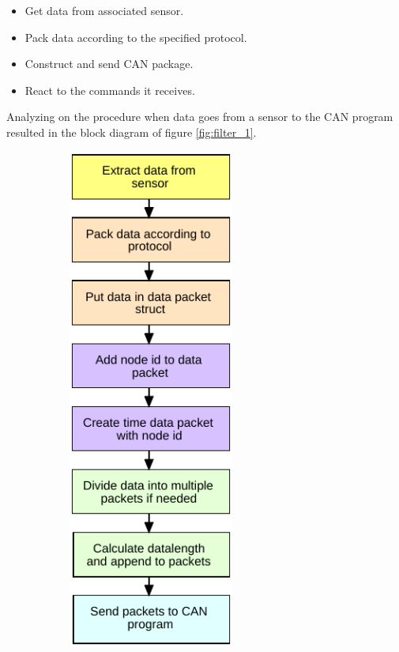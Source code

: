 \begin{itemize}
\item Get data from associated sensor.
\item Pack data according to the specified protocol.
\item Construct and send CAN package.
\item React to the commands it receives.
\end{itemize}

Analyzing on the procedure when data goes from a sensor to the CAN program resulted in the block diagram of figure \ref{fig:filter_1}.

\begin{figure}[!h]
\centering
\begin{subfigure}{0.45\textwidth}
\centering
\includegraphics[width=0.60\textwidth]{graphics/FlowChart_Node_Packing}

\end{subfigure}
\end{figure}
